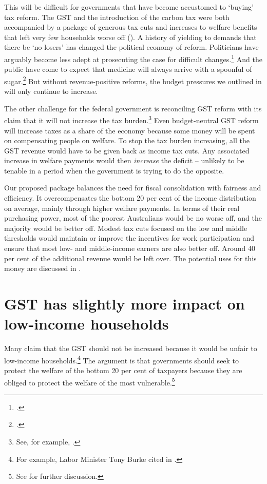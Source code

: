This will be difficult for governments that have become accustomed to ‘buying’ tax reform. The GST and the introduction of the carbon tax were both accompanied by a package of generous tax cuts and increases to welfare benefits that left very few households worse off (). A history of yielding to demands that there be ‘no losers’ has changed the political economy of reform. Politicians have arguably become less adept at prosecuting the case for difficult changes.\footcite[][80]{Megalogenis2010}  And the public have come to expect that medicine will always arrive with a spoonful of sugar.\footcites[][45]{Megalogenis2010}{Henry2015}   But without revenue-positive reforms, the budget pressures we outlined in  will only continue to increase.  

The other challenge for the federal government is reconciling GST reform with its claim that it will not increase the tax burden.\footnote{See, for example, \textcite{Morrison2015-QnA-Melbourne-Institute}.}  Even budget-neutral GST reform will increase taxes as a share of the economy because some money will be spent on compensating people on welfare. To stop the tax burden increasing, all the GST revenue would have to be given back as income tax cuts. Any associated increase in welfare payments would then \emph{increase} the deficit – unlikely to be tenable in a period when the government is trying to do the opposite. 

Our proposed package balances the need for fiscal consolidation with fairness and efficiency. It overcompensates the bottom 20 per cent of the income distribution on average, mainly through higher welfare payments. In terms of their real purchasing power, most of the poorest Australians would be no worse off, and the majority would be better off. Modest tax cuts focused on the low and middle thresholds would maintain or improve the incentives for work participation and ensure that most low- and middle-income earners are also better off. Around 40 per cent of the additional revenue would be left over. The potential uses for this money are discussed in . 

\section{GST has slightly more impact on low-income households}\label{sec:GST-3-1}
Many claim that the GST should not be increased because it would be unfair to low-income households.\footnote{For example, Labor Minister Tony Burke cited in \textcite{Hutchens2015-ALP-not-support-GST}.}  The argument is that governments should seek to protect the welfare of the bottom 20 per cent of taxpayers because they are obliged to protect the welfare of the most vulnerable.\footnote{See \textcite[][21]{Daley2013} for further discussion.}

